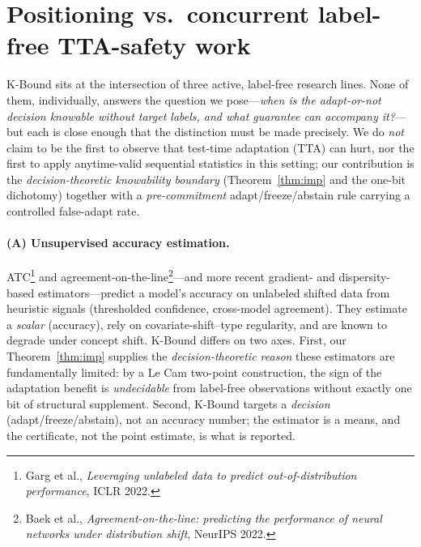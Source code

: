 
\section{Positioning vs.\ concurrent label-free TTA-safety work}\label{sec:positioning}

K-Bound sits at the intersection of three active, label-free research lines. None of
them, individually, answers the question we pose---\emph{when is the adapt-or-not
decision knowable without target labels, and what guarantee can accompany it?}---but
each is close enough that the distinction must be made precisely. We do \emph{not}
claim to be the first to observe that test-time adaptation (TTA) can hurt, nor the
first to apply anytime-valid sequential statistics in this setting; our contribution
is the \emph{decision-theoretic knowability boundary} (Theorem~\ref{thm:imp} and the
one-bit dichotomy) together with a \emph{pre-commitment} adapt/freeze/abstain rule
carrying a controlled false-adapt rate.

\paragraph{(A) Unsupervised accuracy estimation.}
ATC\footnote{Garg et al., \emph{Leveraging unlabeled data to predict out-of-distribution
performance}, ICLR 2022.} and agreement-on-the-line\footnote{Baek et al., \emph{Agreement-on-the-line:
predicting the performance of neural networks under distribution shift}, NeurIPS
2022.}---and more recent gradient- and dispersity-based
estimators---predict a model's accuracy on unlabeled shifted data from heuristic
signals (thresholded confidence, cross-model agreement). They estimate a
\emph{scalar} (accuracy), rely on covariate-shift--type regularity, and are known to
degrade under concept shift. K-Bound differs on two axes. First, our
Theorem~\ref{thm:imp} supplies the \emph{decision-theoretic reason} these estimators
are fundamentally limited: by a Le Cam two-point construction, the sign of the
adaptation benefit is \emph{undecidable} from label-free observations without exactly
one bit of structural supplement. Second, K-Bound targets a \emph{decision}
(adapt/freeze/abstain), not an accuracy number; the estimator is a means, and the
certificate, not the point estimate, is what is reported.

